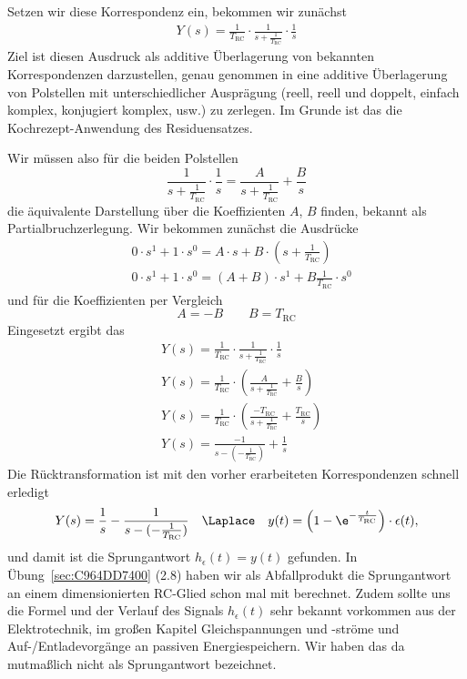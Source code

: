 \begin{Loesung}
\begin{itemize}
Setzen wir diese Korrespondenz ein, bekommen wir zunächst
\begin{align}
Y(s) = \frac{1}{T_\mathrm{RC}}\cdot\frac{1}{s + \frac{1}{T_\mathrm{RC}}} \cdot \frac{1}{s}
\end{align}
Ziel ist diesen Ausdruck als additive Überlagerung von bekannten Korrespondenzen
darzustellen, genau genommen in eine additive Überlagerung von Polstellen mit
unterschiedlicher Ausprägung
(reell, reell und doppelt, einfach komplex, konjugiert komplex, usw.) zu zerlegen.
Im Grunde ist das die Kochrezept-Anwendung des Residuensatzes.

Wir müssen also für die beiden Polstellen
\begin{equation}
\frac{1}{s + \frac{1}{T_\mathrm{RC}}} \cdot \frac{1}{s} =
\frac{A}{s + \frac{1}{T_\mathrm{RC}}} + \frac{B}{s}
\end{equation}
die äquivalente Darstellung über die Koeffizienten $A$, $B$ finden, bekannt als
Partialbruchzerlegung.
Wir bekommen zunächst die Ausdrücke
\begin{align}
&0\cdot s^1 + 1\cdot s^0 =
A\cdot s + B \cdot (s + \frac{1}{T_\mathrm{RC}})\\
&0\cdot s^1 + 1\cdot s^0 =
(A+B)\cdot s^1 + B \frac{1}{T_\mathrm{RC}} \cdot s^0
\end{align}
und für die Koeffizienten per Vergleich
\begin{equation}
  A=-B\qquad B = T_\mathrm{RC}
\end{equation}
Eingesetzt ergibt das
\begin{align}
&Y(s) = \frac{1}{T_\mathrm{RC}}\cdot\frac{1}{s + \frac{1}{T_\mathrm{RC}}} \cdot \frac{1}{s}\\
&Y(s) = \frac{1}{T_\mathrm{RC}}\cdot \left(\frac{A}{s + \frac{1}{T_\mathrm{RC}}} + \frac{B}{s}\right)\\
&Y(s) = \frac{1}{T_\mathrm{RC}}\cdot \left(\frac{-T_\mathrm{RC}}{s + \frac{1}{T_\mathrm{RC}}} + \frac{T_\mathrm{RC}}{s}\right)\\
&Y(s) = \frac{-1}{s - (-\frac{1}{T_\mathrm{RC}})} + \frac{1}{s}
\end{align}
Die Rücktransformation ist mit den vorher erarbeiteten Korrespondenzen schnell
erledigt
\begin{align}
Y(s) = \frac{1}{s} - \frac{1}{s - (-\frac{1}{T_\mathrm{RC}})} \quad \Laplace \quad
y(t) = \left(1-\e^{-\frac{t}{T_\mathrm{RC}}}\right)\cdot \epsilon(t),
\end{align}
und damit ist die Sprungantwort $h_\epsilon(t) = y(t)$ gefunden.
In Übung~\ref{sec:C964DD7400} (2.8) haben wir als Abfallprodukt die Sprungantwort an einem dimensionierten
RC-Glied schon mal mit berechnet. Zudem sollte uns die Formel und der Verlauf des
Signals $h_\epsilon(t)$ sehr bekannt vorkommen aus der Elektrotechnik,
im großen Kapitel Gleichspannungen und -ströme und Auf-/Entladevorgänge
an passiven Energiespeichern. Wir haben das
da mutmaßlich nicht als Sprungantwort bezeichnet.



\end{itemize}
\end{Loesung}
